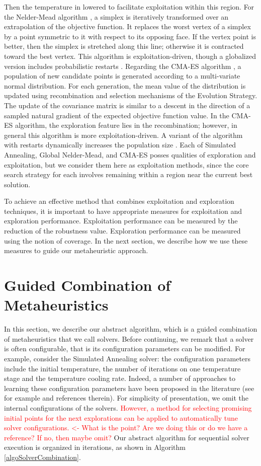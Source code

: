 Then the temperature in lowered to facilitate exploitation within this region. For the Nelder-Mead algorithm \cite{NelderMead65}, a simplex is iteratively transformed over an extrapolation of the objective function. It replaces the worst vertex of a simplex by a point symmetric to it with respect to its opposing face. If the vertex point is better, then the simplex is stretched along this line; otherwise it is contracted toward the best vertex. This algorithm is exploitation-driven, though a globalized version includes probabilistic restarts \cite{CHANG2012684}. Regarding the CMA-ES algorithm \cite{hansen2006eda}, a population of new candidate points is generated according to a multi-variate normal distribution. For each generation, the mean value of the distribution is updated using recombination and selection mechanisms of the Evolution Strategy. The update of the covariance matrix is similar to a descent in the direction of a sampled natural gradient of the expected objective function value. In the CMA-ES algorithm, the exploration feature lies in the recombination; however, in general this algorithm is more exploitation-driven. A variant of the algorithm with restarts dynamically increases the population size \cite{hansen2006eda}. Each of Simulated Annealing, Global Nelder-Mead, and CMA-ES posses qualities of exploration and exploitation, but we consider them here as exploitation methods, since the core search strategy for each involves remaining within a region near the current best solution.

To achieve an effective method that combines exploitation and exploration techniques, it is important to have appropriate measures for exploitation and exploration performance. Exploitation performance can be measured by the reduction of the robustness value. Exploration performance can be measured using the notion of coverage. In the next section, we describe how we use these measures to guide our metaheuristic approach.

\section{Guided Combination of Metaheuristics} \label{sec:combination}
In this section, we describe our abstract algorithm, which is a guided combination of metaheuristics that we call solvers. Before continuing, we remark that a solver is often configurable, that is its configuration parameters can be modified. For example, consider the Simulated Annealing solver: the configuration parameters include the initial temperature, the number of iterations on one temperature stage and the temperature cooling rate. Indeed, a number of approaches to learning these configuration parameters have been proposed in the literature (see for example \cite{HutHooLey11-smac} and references therein). For simplicity of presentation, we omit the internal configurations of the solvers. \textcolor{red}{However, a method for selecting promising initial points for the next explorations can be applied to automatically tune solver configurations. <- What is the point? Are we doing this or do we have a reference? If no, then maybe omit?}
Our abstract algorithm for sequential solver execution is organized in iterations, as shown in Algorithm \ref{algoSolverCombination}. 

